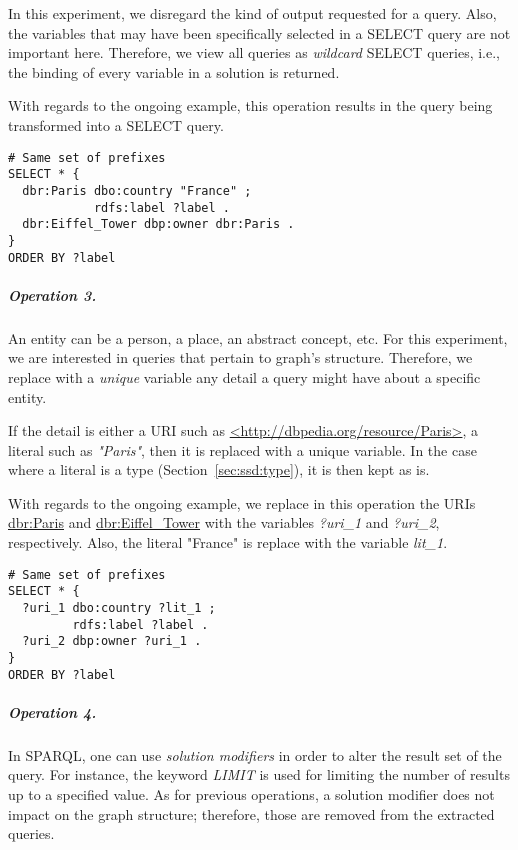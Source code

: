In this experiment, we disregard the kind of output requested for a query. Also, the variables that may have been specifically selected in a SELECT query are not important here. Therefore, we view all queries as \emph{wildcard} SELECT queries, i.e., the binding of every variable in a solution is returned.

With regards to the ongoing example, this operation results in the query being transformed into a SELECT query.
\begin{verbatim}
# Same set of prefixes
SELECT * {
  dbr:Paris dbo:country "France" ;
            rdfs:label ?label .
  dbr:Eiffel_Tower dbp:owner dbr:Paris .
}
ORDER BY ?label
\end{verbatim}

\subparagraph{Operation 3.}

An entity can be a person, a place, an abstract concept, etc. For this experiment, we are interested in queries that pertain to graph's structure. Therefore, we replace with a \emph{unique} variable any detail a query might have about a specific entity.

If the detail is either a URI such as \href{http://dbpedia.org/resource/Paris}{<http://dbpedia.org/resource/Paris>}, a literal such as \emph{"Paris"}, then it is replaced with a unique variable. In the case where a literal is a type (Section~\ref{sec:ssd:type}), it is then kept as is.

With regards to the ongoing example, we replace in this operation the URIs \href{http://dbpedia.org/resource/Paris}{dbr:Paris} and \href{http://dbpedia.org/resource/Eiffel\_Tower}{dbr:Eiffel\_Tower} with the variables \emph{?uri\_1} and \emph{?uri\_2}, respectively. Also, the literal "France" is replace with the variable \emph{lit\_1}.
\begin{verbatim}
# Same set of prefixes
SELECT * {
  ?uri_1 dbo:country ?lit_1 ;
         rdfs:label ?label .
  ?uri_2 dbp:owner ?uri_1 .
}
ORDER BY ?label
\end{verbatim}

\subparagraph{Operation 4.}

In SPARQL, one can use \emph{solution modifiers} in order to alter the result set of the query. For instance, the keyword \emph{LIMIT} is used for limiting the number of results up to a specified value. As for previous operations, a solution modifier does not impact on the graph structure; therefore, those are removed from the extracted queries.

